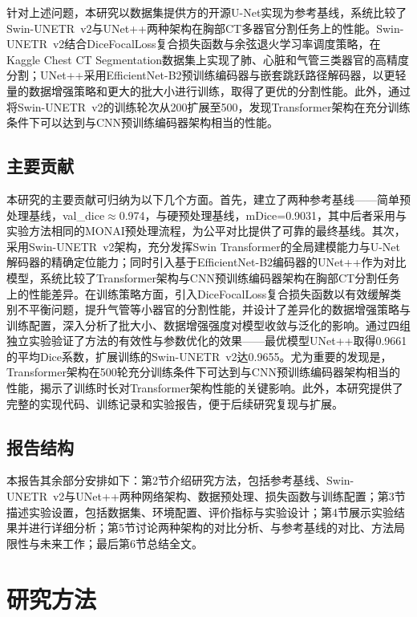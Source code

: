 \documentclass[12pt, a4paper]{article}
\begin{document}
针对上述问题，本研究以数据集提供方的开源U-Net实现为参考基线，系统比较了Swin-UNETR~v2与UNet++两种架构在胸部CT多器官分割任务上的性能。Swin-UNETR~v2结合DiceFocalLoss复合损失函数与余弦退火学习率调度策略，在Kaggle Chest CT Segmentation数据集上实现了肺、心脏和气管三类器官的高精度分割；UNet++采用EfficientNet-B2预训练编码器与嵌套跳跃路径解码器，以更轻量的数据增强策略和更大的批大小进行训练，取得了更优的分割性能。此外，通过将Swin-UNETR~v2的训练轮次从200扩展至500，发现Transformer架构在充分训练条件下可以达到与CNN预训练编码器架构相当的性能。

\subsection{主要贡献}
本研究的主要贡献可归纳为以下几个方面。首先，建立了两种参考基线——简单预处理基线，val\_dice$\approx$0.974，与硬预处理基线，mDice=0.9031，其中后者采用与实验方法相同的MONAI预处理流程，为公平对比提供了可靠的最终基线。其次，采用Swin-UNETR~v2架构，充分发挥Swin Transformer的全局建模能力与U-Net解码器的精确定位能力；同时引入基于EfficientNet-B2编码器的UNet++作为对比模型，系统比较了Transformer架构与CNN预训练编码器架构在胸部CT分割任务上的性能差异。在训练策略方面，引入DiceFocalLoss复合损失函数以有效缓解类别不平衡问题，提升气管等小器官的分割性能，并设计了差异化的数据增强策略与训练配置，深入分析了批大小、数据增强强度对模型收敛与泛化的影响。通过四组独立实验验证了方法的有效性与参数优化的效果——最优模型UNet++取得0.9661的平均Dice系数，扩展训练的Swin-UNETR~v2达0.9655。尤为重要的发现是，Transformer架构在500轮充分训练条件下可达到与CNN预训练编码器架构相当的性能，揭示了训练时长对Transformer架构性能的关键影响。此外，本研究提供了完整的实现代码、训练记录和实验报告，便于后续研究复现与扩展。

\subsection{报告结构}
本报告其余部分安排如下：第2节介绍研究方法，包括参考基线、Swin-UNETR~v2与UNet++两种网络架构、数据预处理、损失函数与训练配置；第3节描述实验设置，包括数据集、环境配置、评价指标与实验设计；第4节展示实验结果并进行详细分析；第5节讨论两种架构的对比分析、与参考基线的对比、方法局限性与未来工作；最后第6节总结全文。

\section{研究方法}
\label{sec:method}
\end{document}
